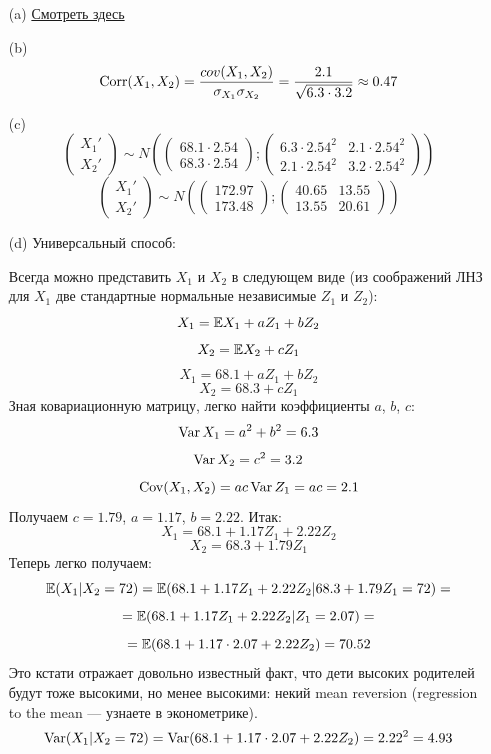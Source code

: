 \documentclass[12pt, a4paper]{article}\usepackage[]{graphicx}\usepackage[]{color}
\begin{document}
\begin{enumerate}
\begin{itemize}
\item[(a)] \href{http://johnhawks.net/explainer/stats/heritability-and-stature/}{Смотреть здесь}
\item[(b)] \[ \operatorname{Corr}(X_1, X_2) = \dfrac{cov(X_1, X_2)}{\sigma_{X_1} \sigma_{X_2}} = \dfrac{2.1}{\sqrt{6.3\cdot 3.2}} \approx 0.47   \]
\item[(c)] $$\begin{pmatrix}
X_1' \\
X_2'
\end{pmatrix} \sim N \left( \begin{pmatrix}
68.1\cdot 2.54 \\
68.3\cdot 2.54
\end{pmatrix} ; \begin{pmatrix}
6.3\cdot 2.54^2 & 2.1 \cdot 2.54^2\\
2.1\cdot 2.54^2 & 3.2 \cdot 2.54^2
\end{pmatrix} \right) $$
$$\begin{pmatrix}
X_1' \\
X_2'
\end{pmatrix} \sim N \left( \begin{pmatrix}
172.97 \\
173.48
\end{pmatrix} ; \begin{pmatrix}
40.65 & 13.55\\
13.55 & 20.61
\end{pmatrix} \right) $$
\item[(d)] Универсальный способ:

Всегда можно представить $X_1$ и $X_2$ в следующем виде (из соображений ЛНЗ для $X_1$ две стандартные нормальные независимые $Z_1$ и $Z_2$):
\[X_1 = \mathbb{E} X_1 + a Z_1 + b Z_2 \]
\[X_2 = \mathbb{E} X_2 + c Z_1 \]
\[X_1 = 68.1 + a Z_1 + b Z_2 \]
\[X_2 = 68.3 + c Z_1 \]
Зная ковариационную матрицу, легко найти коэффициенты $a$, $b$, $c$:
\[\operatorname{Var} X_1 = a^2 + b^2 = 6.3   \]
\[\operatorname{Var} X_2 = c^2 = 3.2   \]
\[\operatorname{Cov} (X_1, X_2) = ac\operatorname{Var} Z_1= ac = 2.1   \]
Получаем $c = 1.79$, $a = 1.17$, $b=2.22$.
Итак: \[X_1 = 68.1 + 1.17 Z_1 + 2.22 Z_2 \]
\[X_2 = 68.3 + 1.79 Z_1 \]
Теперь легко получаем:
\[ \mathbb{E} (X_1 | X_2 = 72) = \mathbb{E} ( 68.1 + 1.17 Z_1 + 2.22 Z_2|  68.3 + 1.79 Z_1 = 72) =   \]
\[ =   \mathbb{E} ( 68.1 + 1.17 Z_1 + 2.22 Z_2|  Z_1 = 2.07) = \]
\[ = \mathbb{E} (68.1 + 1.17 \cdot 2.07 + 2.22 Z_2) = 70.52 \]
Это кстати отражает довольно известный факт, что дети высоких родителей будут тоже высокими, но менее высокими: некий mean reversion (regression to the mean — узнаете в эконометрике).
\[ \operatorname{Var} (X_1 | X_2 = 72) = \operatorname{Var} ( 68.1 + 1.17 \cdot 2.07 + 2.22 Z_2) = 2.22^2 = 4.93   \]


\end{itemize}
\end{enumerate}
\end{document}
